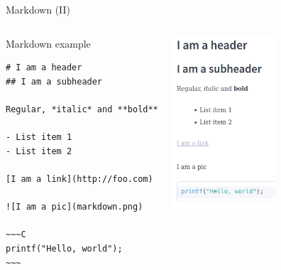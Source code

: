 \documentclass[10pt,compress]{beamer} %
\begin{document}
\begin{frame}[fragile]{Markdown (II)}
	\vspace{-0.3cm}
	\begin{columns}
		\begin{exampleblock}{Markdown example}
			\vspace{-0.3cm}
			\begin{lstlisting}[mathescape]
# I am a header
## I am a subheader

Regular, *italic* and **bold**

- List item 1
- List item 2

[I am a link](http://foo.com)

![I am a pic](markdown.png)

~~~C
printf("Hello, world");
~~~
\end{lstlisting}
			\vspace{-0.2cm}
		\end{exampleblock}
 		\includegraphics[width=0.6\textwidth]{figs/md.png}
	\end{columns}
\end{frame}



\end{document}
